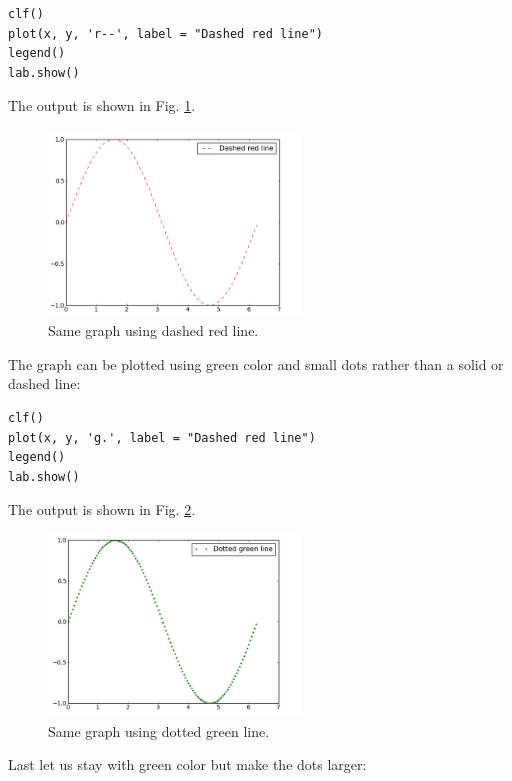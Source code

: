 \documentclass{article}
\begin{document}
\begin{verbatim}
clf()
plot(x, y, 'r--', label = "Dashed red line")
legend()
lab.show()
\end{verbatim}
The output is shown in Fig. \ref{fig:plot3}.

\begin{figure}[!ht]
\begin{center}
\includegraphics[width=0.6\textwidth]{img/plot3.png}
\end{center}
\vspace{-6mm}
\caption{Same graph using dashed red line.}
\label{fig:plot3}
\end{figure}
\noindent
The graph can be plotted using green color and small dots rather than 
a solid or dashed line:

\begin{verbatim}
clf()
plot(x, y, 'g.', label = "Dashed red line")
legend()
lab.show()
\end{verbatim}
The output is shown in Fig. \ref{fig:plot4}.
\newpage

\begin{figure}[!ht]
\begin{center}
\includegraphics[width=0.6\textwidth]{img/plot4.png}
\end{center}
\vspace{-6mm}
\caption{Same graph using dotted green line.}
\label{fig:plot4}
\end{figure}
\noindent
Last let us stay with green color but make the dots larger:
\end{document}
